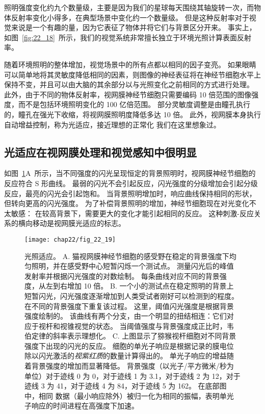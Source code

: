 照明强度变化约九个数量级，主要是因为我们的星球每天围绕其轴旋转一次，而物体反射率变化小得多，在典型场景中变化约一个数量级。
但是这种反射率对于视觉来说是一个有趣的量，因为它表征了物体并将它们与背景区分开来。
事实上，如图~\ref{fig:22_18}~所示，我们的视觉系统非常擅长独立于环境光照计算表面反射率。


随着环境照明的整体增加，视觉场景中的所有点都以相同的因子变亮。
如果眼睛可以简单地将其灵敏度降低相同的因素，则图像的神经表征将在神经节细胞水平上保持不变，并且可以由大脑的其余部分以与光照变化之前相同的方式进行处理。 
此外，由于不同的物体反射率，视网膜神经节细胞只需要编码 10 倍范围的图像强度，而不是包括环境照明变化的 100 亿倍范围。
部分灵敏度调整是由瞳孔执行的，瞳孔在强光下收缩，将视网膜照明度降低多达 10 倍。
此外，视网膜本身执行自动增益控制，称为光适应，接近理想的正常化 我们在这里想象过。



\subsection{光适应在视网膜处理和视觉感知中很明显}

如图~\ref{fig:22_19}A~所示，当不同强度的闪光呈现恒定的背景照明时，视网膜神经节细胞的反应符合 S 形曲线。
最弱的闪光不会引起反应，闪光强度的分级增加会引起分级反应，最亮的闪光会引起饱和。
当背景照明增加时，响应曲线保持相同的形状，但转向更高的闪光强度。
为了补偿背景照明的增加，神经节细胞现在对光变化不太敏感：
在较高背景下，需要更大的变化才能引起相同的反应。
这种刺激-反应关系的横向移动是视网膜光适应的标志。


\begin{figure}[htbp]
	\centering
	\texttt{[image: chap22/fig\_22\_19]}
	\caption{光照适应。 
		A. 猫视网膜神经节细胞的感受野在稳定的背景强度下均匀照明，并在感受野中心短暂闪烁一个测试点。 
		测量闪光后的峰值发射率并根据闪光强度的对数绘制。
		每条曲线对应不同的背景强度，从左到右增加 10 倍\cite{sakmann1969scotopic}。
		B. 一个小的测试点在稳定照明的背景上短暂闪光，闪光强度逐渐增加到人类受试者刚好可以检测到的程度。
		在不同的背景强度下重复该过程。
		这里，阈值闪光强度是根据背景强度绘制的。
		该曲线有两个分支，由一个明显的扭结相连：它们对应于视杆和视锥视觉的状态。 
		当阈值强度与背景强度成正比时，韦伯定律的斜率表示理想化\cite{wyszecki2000color}。
		C. 上图显示了猕猴视杆细胞对不同背景强度下出现的闪光的反应。 
		细胞的单光子响应是根据记录的膜电位除以闪光激活的\textit{视紫红质}的数量计算得出的。 
		单光子响应的增益随着背景强度的增加而显著降低。
		背景强度（以光子/平方微米/秒为单位）对于迹线 0 为 0，对于迹线 1 为 3.1，对于迹线 2 为 12，对于迹线 3 为 41，对于迹线 4 为 84，对于迹线 5 为 162。
		在底部图中，相同 数据（最小响应除外）被归一化为相同的振幅，表明单光子响应的时间进程在高强度下加速\cite{schneeweis2000noise}。}
	\label{fig:22_19}
\end{figure}


